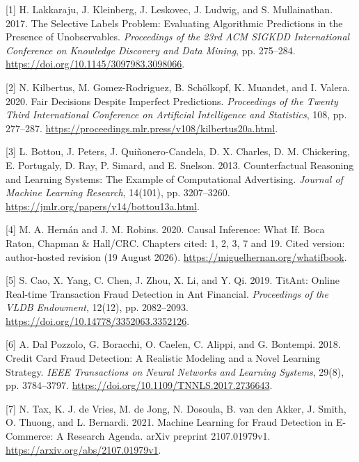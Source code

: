 \documentclass[acmlarge,review,anonymous,nonacm]{acmart}
\newlength{\cslhangindent}
\newlength{\cslentryspacingunit} %
\newenvironment{CSLReferences}[2] %
 {\bibliofont %
  \setlength{\parindent}{0pt}
  \ifodd #1
  \let\oldpar\par
  \def\par{\hangindent=\cslhangindent\oldpar}
  \fi
  \setlength{\parskip}{#2\cslentryspacingunit}
 }%
 {}
\begin{document}
\hypertarget{refs}{}
\begin{CSLReferences}{1}{1}
\leavevmode{}%
{[}1{]} H. Lakkaraju, J. Kleinberg, J. Leskovec, J. Ludwig, and S.
Mullainathan. 2017. The Selective Labels Problem: Evaluating Algorithmic
Predictions in the Presence of Unobservables. \emph{Proceedings of the
23rd ACM SIGKDD International Conference on Knowledge Discovery and Data
Mining}, pp. 275--284. \url{https://doi.org/10.1145/3097983.3098066}.

\leavevmode{}%
{[}2{]} N. Kilbertus, M. Gomez-Rodriguez, B. Schölkopf, K. Muandet, and
I. Valera. 2020. Fair Decisions Despite Imperfect Predictions.
\emph{Proceedings of the Twenty Third International Conference on
Artificial Intelligence and Statistics}, 108, pp. 277--287.
\url{https://proceedings.mlr.press/v108/kilbertus20a.html}.

\leavevmode{}%
{[}3{]} L. Bottou, J. Peters, J. Quiñonero-Candela, D. X. Charles, D. M.
Chickering, E. Portugaly, D. Ray, P. Simard, and E. Snelson. 2013.
Counterfactual Reasoning and Learning Systems: The Example of
Computational Advertising. \emph{Journal of Machine Learning Research},
14(101), pp. 3207--3260.
\url{https://jmlr.org/papers/v14/bottou13a.html}.

\leavevmode{}%
{[}4{]} M. A. Hernán and J. M. Robins. 2020. Causal Inference: What If.
Boca Raton, Chapman \& Hall/CRC. Chapters cited: 1, 2, 3, 7 and 19.
Cited version: author-hosted revision (19 August 2026).
\url{https://miguelhernan.org/whatifbook}.

\leavevmode{}%
{[}5{]} S. Cao, X. Yang, C. Chen, J. Zhou, X. Li, and Y. Qi. 2019.
TitAnt: Online Real-time Transaction Fraud Detection in Ant Financial.
\emph{Proceedings of the VLDB Endowment}, 12(12), pp. 2082--2093.
\url{https://doi.org/10.14778/3352063.3352126}.

\leavevmode{}%
{[}6{]} A. Dal Pozzolo, G. Boracchi, O. Caelen, C. Alippi, and G.
Bontempi. 2018. Credit Card Fraud Detection: A Realistic Modeling and a
Novel Learning Strategy. \emph{IEEE Transactions on Neural Networks and
Learning Systems}, 29(8), pp. 3784--3797.
\url{https://doi.org/10.1109/TNNLS.2017.2736643}.

\leavevmode{}%
{[}7{]} N. Tax, K. J. de Vries, M. de Jong, N. Dosoula, B. van den
Akker, J. Smith, O. Thuong, and L. Bernardi. 2021. Machine Learning for
Fraud Detection in E-Commerce: A Research Agenda. arXiv preprint
2107.01979v1. \url{https://arxiv.org/abs/2107.01979v1}.


\end{CSLReferences}
\end{document}
